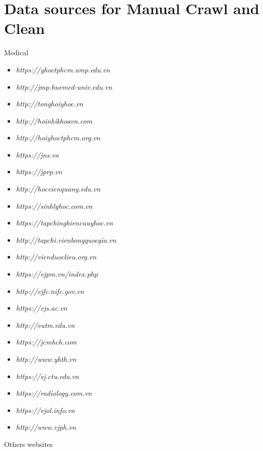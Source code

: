 \documentclass[11pt]{article}
\begin{document}
\section{Data sources for Manual Crawl and Clean}
\label{app:source}





Medical
\begin{itemize}
\color{darkblue}
\item \textsl{https://yhoctphcm.ump.edu.vn}
\item \textsl{http://jmp.huemed-univ.edu.vn}
\item \textsl{http://tonghoiyhoc.vn}
\item \textsl{http://hoinhikhoavn.com}
\item \textsl{http://hoiyhoctphcm.org.vn}
\item \textsl{https://jns.vn}
\item \textsl{https://jprp.vn}
\item \textsl{http://hocvienquany.edu.vn}
\item \textsl{https://sinhlyhoc.com.vn}
\item \textsl{https://tapchinghiencuuyhoc.vn}
\item \textsl{http://tapchi.vienbongquocgia.vn}
\item \textsl{http://vienduoclieu.org.vn}
\item \textsl{https://vjpm.vn/index.php}
\item \textsl{http://vjfc.nifc.gov.vn}
\item \textsl{https://vjs.ac.vn}
\item \textsl{http://vutm.edu.vn}
\item \textsl{https://jcmhch.com}
\item \textsl{http://www.yhth.vn}
\item \textsl{https://sj.ctu.edu.vn}
\item \textsl{https://radiology.com.vn}
\item \textsl{https://vjol.info.vn}
\item \textsl{http://www.vjph.vn}
  
\end{itemize}
Others websites
\end{document}
